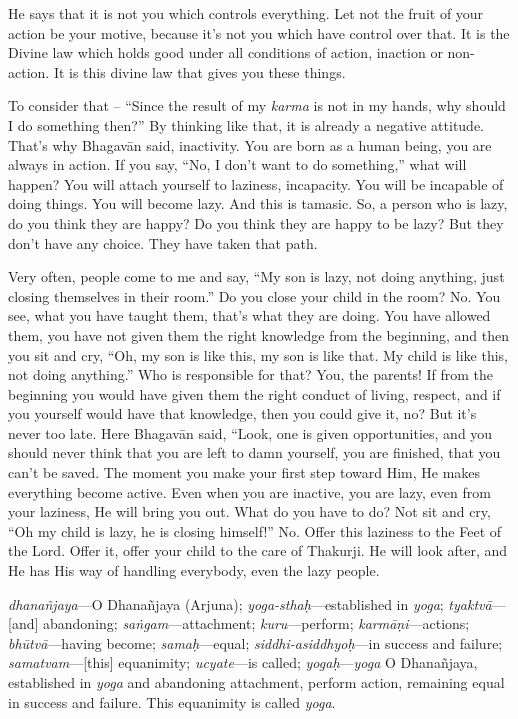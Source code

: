 He says that it is not you which controls everything. Let not the fruit of your action be your motive, because it’s not you which have control over that. It is the Divine law which holds good under all conditions of action, inaction or non-action. It is this divine law that gives you these things.

To consider that – “Since the result of my \textit{karma} is not in my hands, why should I do something then?” By thinking like that, it is already a negative attitude. That’s why Bhagavān said, inactivity. You are born as a human being, you are always in action. If you say, “No, I don’t want to do something,” what will happen? You will attach yourself to laziness, incapacity. You will be incapable of doing things. You will become lazy. And this is tamasic. So, a person who is lazy, do you think they are happy? Do you think they are happy to be lazy? But they don’t have any choice. They have taken that path.

Very often, people come to me and say, “My son is lazy, not doing anything, just closing themselves in their room.” Do you close your child in the room? No. You see, what you have taught them, that’s what they are doing. You have allowed them, you have not given them the right knowledge from the beginning, and then you sit and cry, “Oh, my son is like this, my son is like that. My child is like this, not doing anything.” Who is responsible for that? You, the parents! If from the beginning you would have given them the right conduct of living, respect, and if you yourself would have that knowledge, then you could give it, no? But it’s never too late. Here Bhagavān said, “Look, one is given opportunities, and you should never think that you are left to damn yourself, you are finished, that you can’t be saved. The moment you make your first step toward Him, He makes everything become active. Even when you are inactive, you are lazy, even from your laziness, He will bring you out. What do you have to do? Not sit and cry, “Oh my child is lazy, he is closing himself!” No. Offer this laziness to the Feet of the Lord. Offer it, offer your child to the care of Thakurji. He will look after, and He has His way of handling everybody, even the lazy people.

{%
  \textit{dhanañjaya}---O Dhanañjaya (Arjuna); 
  \textit{yoga-sthaḥ}---established in \textit{yoga}; 
  \textit{tyaktvā}---[and] abandoning; 
  \textit{saṅgam}---attachment; 
  \textit{kuru}---perform; 
  \textit{karmāṇi}---actions; 
  \textit{bhūtvā}---having become; 
  \textit{samaḥ}---equal; 
  \textit{siddhi-asiddhyoḥ}---in success and failure; 
  \textit{samatvam}---[this] equanimity; 
  \textit{ucyate}---is called; 
  \textit{yogaḥ}---\textit{yoga}
}
{%
  O Dhanañjaya, established in \textit{yoga} and abandoning attachment, perform action, remaining equal in success and failure. This equanimity is called \textit{yoga}.
}


